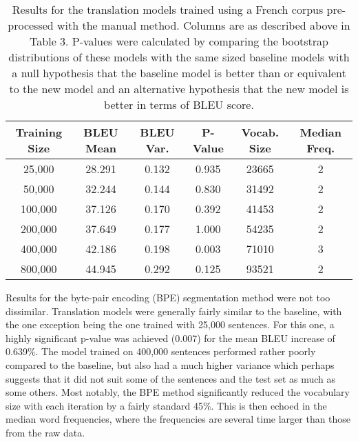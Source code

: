 \documentclass[11pt]{article}
\begin{document}
\begin{table}[h]
\centering
\begin{tabular}{|c|c|c|c|c|c|}
\hline
Training Size & BLEU Mean & BLEU Var. & P-Value & Vocab. Size & Median Freq. \\ \hline
25,000             & 28.291    & 0.132         & 0.935   & 23665           & 2                     \\
50,000             & 32.244    & 0.144         & 0.830   & 31492           & 2                     \\
100,000            & 37.126    & 0.170         & 0.392   & 41453           & 2                     \\
200,000            & 37.649    & 0.177         & 1.000   & 54235           & 2                     \\
400,000            & 42.186    & 0.198         & 0.003   & 71010           & 3                     \\
800,000            & 44.945    & 0.292         & 0.125   & 93521           & 2                     \\ \hline
\end{tabular}
\caption{Results for the translation models trained using a French corpus pre-processed with the manual method. Columns are as described above in Table 3. P-values were calculated by comparing the bootstrap distributions of these models with the same sized baseline models with a null hypothesis that the baseline model is better than or equivalent to the new model and an alternative hypothesis that the new model is better in terms of BLEU score.}
\label{tab:manual}
\end{table}

\bigskip

Results for the byte-pair encoding (BPE) segmentation method were not too dissimilar. Translation models were generally fairly similar to the baseline, with the one exception being the one trained with 25,000 sentences. For this one, a highly significant p-value was achieved (0.007) for the mean BLEU increase of 0.639\%. The model trained on 400,000 sentences performed rather poorly compared to the baseline, but also had a much higher variance which perhaps suggests that it did not suit some of the sentences and the test set as much as some others. Most notably, the BPE method significantly reduced the vocabulary size with each iteration by a fairly standard 45\%. This is then echoed in the median word frequencies, where the frequencies are several time larger than those from the raw data. 
\end{document}
